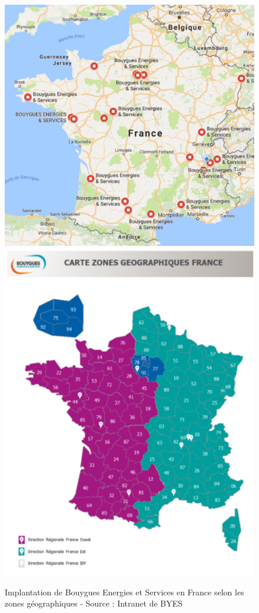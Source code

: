 \documentclass[a4paper]{article}
\begin{document}
    \begin{figure}[H]
    \includegraphics[scale=0.5]{img/implantationFrance}
    \includegraphics[scale=0.5]{img/ZGFrance}
    \caption{Implantation de Bouygues Energies et Services en France selon les zones géographiques - Source : Intranet de BYES}
    \end{figure}
\end{document}
